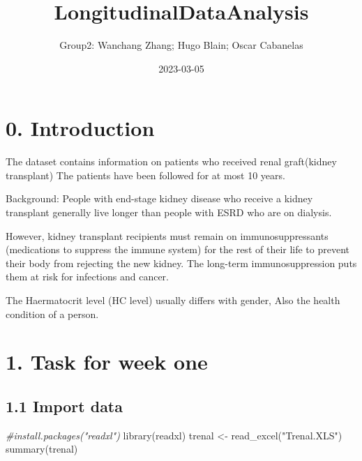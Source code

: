 \documentclass[
]{article}
\title{LongitudinalDataAnalysis}
\author{Group2: Wanchang Zhang; Hugo Blain; Oscar Cabanelas}
\date{2023-03-05}
\newenvironment{Shaded}{\begin{snugshade}}{\end{snugshade}}
\newcommand{\CommentTok}[1]{\textcolor[rgb]{0.56,0.35,0.01}{\textit{#1}}}
\newcommand{\FunctionTok}[1]{\textcolor[rgb]{0.00,0.00,0.00}{#1}}
\newcommand{\NormalTok}[1]{#1}
\newcommand{\OtherTok}[1]{\textcolor[rgb]{0.56,0.35,0.01}{#1}}
\newcommand{\StringTok}[1]{\textcolor[rgb]{0.31,0.60,0.02}{#1}}
\begin{document}
\maketitle

\hypertarget{introduction}{%
\section{0. Introduction}\label{introduction}}

The dataset contains information on patients who received renal
graft(kidney transplant) The patients have been followed for at most 10
years.

Background: People with end-stage kidney disease who receive a kidney
transplant generally live longer than people with ESRD who are on
dialysis.

However, kidney transplant recipients must remain on immunosuppressants
(medications to suppress the immune system) for the rest of their life
to prevent their body from rejecting the new kidney. The long-term
immunosuppression puts them at risk for infections and cancer.

The Haermatocrit level (HC level) usually differs with gender, Also the
health condition of a person.

\hypertarget{task-for-week-one}{%
\section{1. Task for week one}\label{task-for-week-one}}

\hypertarget{import-data}{%
\subsection{1.1 Import data}\label{import-data}}

\begin{Shaded}
\begin{Highlighting}[]
\CommentTok{\#install.packages("readxl")}
\FunctionTok{library}\NormalTok{(readxl)}
\NormalTok{trenal }\OtherTok{\textless{}{-}} \FunctionTok{read\_excel}\NormalTok{(}\StringTok{"Trenal.XLS"}\NormalTok{)}
\FunctionTok{summary}\NormalTok{(trenal)}
\end{Highlighting}
\end{Shaded}
\end{document}
